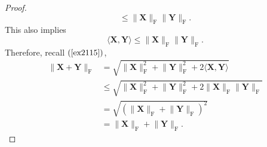 \documentclass{article}
\theoremstyle{plain}
\begin{document}
\begin{proof}
\begin{equation*}
		\leq \lVert \bm{X} \rVert_{\mathrm{F}} \lVert \bm{Y} \rVert_{\mathrm{F}} .
	\end{equation*}
	This also implies
	\begin{equation*}
		\langle \bm{X} , \bm{Y} \rangle \leq \lVert \bm{X} \rVert_{\mathrm{F}} \lVert \bm{Y} \rVert_{\mathrm{F}} .
	\end{equation*}
	Therefore, recall $(\ref{ex2115})$,
	\begin{equation*}
		\begin{split}
			\lVert \bm{X} + \bm{Y} \rVert_\mathrm{F} &= \sqrt{\lVert \bm{X} \rVert_\mathrm{F}^2
			+ \lVert \bm{Y} \rVert_\mathrm{F}^2 + 2 \langle \bm{X} , \bm{Y} \rangle} \\
			&\leq \sqrt{\lVert \bm{X} \rVert_\mathrm{F}^2
			+ \lVert \bm{Y} \rVert_\mathrm{F}^2 + 2 \lVert \bm{X} \rVert_{\mathrm{F}} \lVert \bm{Y} \rVert_{\mathrm{F}}} \\
			&= \sqrt{(\lVert \bm{X} \rVert_\mathrm{F} + \lVert \bm{Y} \rVert_\mathrm{F})^2} \\
			&= \lVert \bm{X} \rVert_\mathrm{F} + \lVert \bm{Y} \rVert_\mathrm{F} .
		\end{split}
	\end{equation*}
\end{proof}
\end{document}
